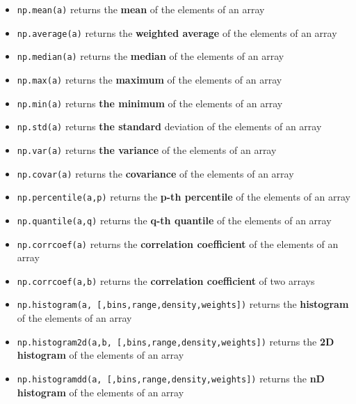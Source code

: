 \documentclass[
  letterpaper,
  DIV=11,
  numbers=noendperiod]{scrreprt}
\begin{document}
\begin{itemize}
\item
  \texttt{np.mean(a)} returns the \textbf{mean} of the elements of an
  array
\item
  \texttt{np.average(a)} returns the \textbf{weighted average} of the
  elements of an array
\item
  \texttt{np.median(a)} returns the \textbf{median} of the elements of
  an array
\item
  \texttt{np.max(a)} returns the \textbf{maximum} of the elements of an
  array
\item
  \texttt{np.min(a)} returns \textbf{the minimum} of the elements of an
  array
\item
  \texttt{np.std(a)} returns \textbf{the standard} deviation of the
  elements of an array
\item
  \texttt{np.var(a)} returns \textbf{the variance} of the elements of an
  array
\item
  \texttt{np.covar(a)} returns the \textbf{covariance} of the elements
  of an array
\item
  \texttt{np.percentile(a,p)} returns the \textbf{p-th percentile} of
  the elements of an array
\item
  \texttt{np.quantile(a,q)} returns the \textbf{q-th quantile} of the
  elements of an array
\item
  \texttt{np.corrcoef(a)} returns the \textbf{correlation coefficient}
  of the elements of an array
\item
  \texttt{np.corrcoef(a,b)} returns the \textbf{correlation coefficient}
  of two arrays
\item
  \texttt{np.histogram(a,\ {[},bins,range,density,weights{]})} returns
  the \textbf{histogram} of the elements of an array
\item
  \texttt{np.histogram2d(a,b,\ {[},bins,range,density,weights{]})}
  returns the \textbf{2D histogram} of the elements of an array
\item
  \texttt{np.histogramdd(a,\ {[},bins,range,density,weights{]})} returns
  the \textbf{nD histogram} of the elements of an array
\end{itemize}
\end{document}
